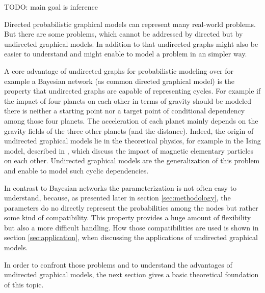 TODO: main goal is inference

Directed probabilistic graphical models can represent many real-world problems. But there are some problems, which cannot be addressed by directed but by undirected graphical models. In addition to that undirected graphs might also be easier to understand and might enable to model a problem in an simpler way.

A core advantage of undirected graphs for probabilistic modeling over for example a Bayesian network (as common directed graphical model) is the property that undirected graphs are capable of representing cycles. For example if the impact of four planets on each other in terms of gravity should be modeled there is neither a starting point nor a target point of conditional dependency among those four planets. The acceleration of each planet mainly depends on the gravity fields of the three other planets (and the distance). Indeed, the origin of undirected graphical models lie in the theoretical physics, for example in the Ising model, described in \cite{ising1925beitrag}, which discuss the impact of magnetic elementary particles on each other. Undirected graphical models are the generalization of this problem and enable to model such cyclic dependencies.

In contrast to Bayesian networks the parameterization is not often easy to understand, because, as presented later in section \ref{sec:methodology}, the parameters do no directly represent the probabilities among the nodes but rather some kind of compatibility. This property provides a huge amount of flexibility but also a more difficult handling. How those compatibilities are used is shown in section \ref{sec:application}, when discussing the applications of undirected graphical models. 

In order to confront those problems and to understand the advantages of undirected graphical models, the next section gives a basic theoretical foundation of this topic.
